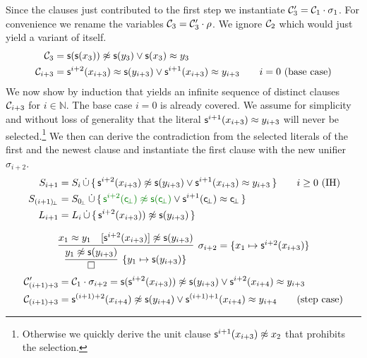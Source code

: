 \begin{example}
Since the clauses just contributed to the first step
we instantiate $\mathcal{C}'_3 = \mathcal{C}_1\cdot\sigma_1$.
For convenience we rename the variables $\mathcal{C}_3 = \mathcal{C}_3'\cdot\rho$.
We ignore $\mathcal{C}_2$ which would just yield a variant of itself.
\begin{align*}
	\mathcal{C}_3 &= \mathsf{s}(\mathsf{s}(x_3)) \not\approx \mathsf{s}(y_3) \lor \mathsf{s}(x_3) \approx y_3
	\\
	\mathcal{C}_{i+3} &= \mathsf{s}^{i+2}(x_{i+3})\approx \mathsf{s}(y_{i+3}) \lor \mathsf{s}^{i+1}(x_{i+3})\approx y_{i+3}
	\tag*{$i=0$ (base case)}
	\end{align*}
	We now show by induction that \InstGenEQ yields an infinite sequence of distinct clauses $\mathcal{C}_{i+3}$ for $i\in\mathbb{N}$.
	The base case $i=0$ is already covered. We assume for simplicity and without loss of generality that the literal $\mathsf{s}^{i+1}(x_{i+3})\approx y_{i+3}$ will never be selected.\footnote{
		Otherwise we quickly derive the unit clause $\mathsf{s}^{i+1}(x_{i+3})\not\approx x_2$ that prohibits the selection.}
	We then can derive the contradiction from the selected literals of the first and the newest clause
	and instantiate the first clause with the new unifier $\sigma_{i+2}$.
	\begin{align*}
	S_{i+1} &= S_i\disjointunion\, \{\,
	\msucc^{i+2}(x_{i+3}) \mNE \msucc(y_{i+3}) \lor \msucc^{i+1}(x_{i+3}) \mEQ y_{i+3} \,
	\}
	\tag*{$i\geq 0$ (IH)}
	\\
	S_{(i+1)\!_\bot} &= S_{0\!_\bot}\disjointunion\, \{\,
	{\colHi\msucc^{i+2}(\consbot) \mNE \msucc(\consbot)} \lor {\msucc^{i+1}(\consbot) \mEQ \consbot} \,
	\}
	\\
	L_{i+1} &= L_i \disjointunion\, \{\,
		\msucc^{i+2}(x_{i+3})) \mNE \msucc(y_{i+3})
	\,\}
	\\[0.7em]
	&\infer[\sigma_{i+2} = \{ x_1\mapsto \msucc^{i+2}(x_{i+3})\}
	]{
		\infer[\{y_1\mapsto \msucc(y_{i+3})\}]{\emptyclause}{ y_1\mNE \msucc(y_{i+3}) }
	}
	{x_1 \mEQ y_1 & [\msucc^{i+2}(x_{i+3})]\mNE \msucc(y_{i+3})}
	\\
	\mcC'_{(i+1)+3} &= \mcC_1\cdot\sigma_{i+2} =
	\msucc(\msucc^{i+2}(x_{i+3})) \mNE \msucc(y_{i+3}) \lor \msucc^{i+2}(x_{i+4}) \mEQ y_{i+3}
	\\
	\mcC_{(i+1)+3} &=
	\msucc^{(i+1)+2}(x_{i+4}) \mNE \msucc(y_{i+4}) \lor \msucc^{(i+1)+1}(x_{i+4}) \mEQ y_{i+4}
	\tag{step case}
\end{align*}


\end{example}
